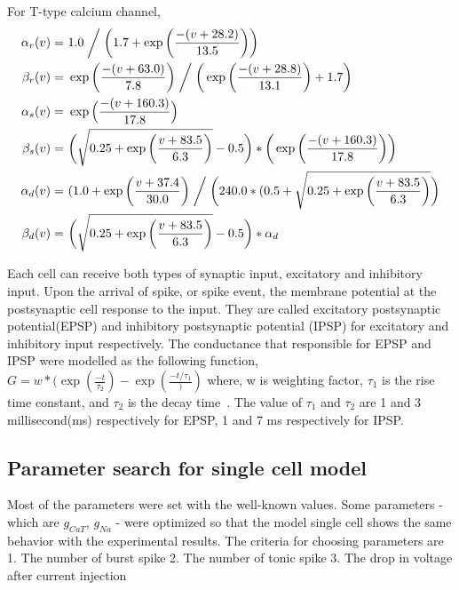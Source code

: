 For T-type calcium channel, %
\begin{align*} %
\alpha_{r}(v) =&\ 1.0\biggm/ \bigg(1.7+\exp\bigg(\frac{-(v+28.2)}{13.5}\bigg)\bigg)  \\
\beta_{r}(v) =&\ \exp\bigg(\frac{-(v+63.0)}{7.8}\bigg) \biggm/  \bigg( \exp \bigg( \frac{-(v+28.8)}{13.1} \bigg) +1.7\bigg)\\
\alpha_{s}(v) =&\ \exp \Big(\frac{-(v+160.3)}{17.8}\Big)\\
\beta_{s}(v) =&\ \bigg(\sqrt{0.25+\exp\bigg(\frac{v+83.5}{6.3}\bigg)}-0.5\bigg) *  \bigg(\exp\bigg(\frac{-(v+160.3)}{17.8}\bigg)\bigg)\\
\alpha_{d}(v) =&\ (1.0+\exp\bigg(\frac{v+37.4}{30.0}\bigg) \biggm/ \bigg(240.0*(0.5+ \sqrt{0.25+\exp\bigg(\frac{v+83.5}{6.3} \bigg) } \bigg) \\
\beta_{d}(v) =&\ \bigg(\sqrt{0.25+\exp\bigg(\frac{v+83.5}{6.3} \bigg) } -0.5\bigg)*\alpha_d\\  
\end{align*}

%
%
%
%

Each cell can receive both types of synaptic input, excitatory  and inhibitory input. Upon the arrival of spike, or spike event, the membrane potential at the postsynaptic cell response to the input. They are called excitatory postsynaptic potential(EPSP) and inhibitory postsynaptic potential (IPSP) for excitatory and inhibitory input respectively. 
The conductance that responsible for EPSP and IPSP were modelled as the following function,
$G = w*(\exp(\frac{-t}{\tau_2} ) - \exp(\frac{-t/\tau_1}))$
where, w is weighting factor, $\tau_1$ is the rise time constant, and $\tau_2$ is the decay time~\cite {constantcarnevale2006neuron}.
The value of $\tau_1$ and $\tau_2$  are 1 and 3 millisecond(ms) respectively for EPSP, 1 and 7 ms respectively for IPSP.




\subsection{Parameter search for single cell model}
Most of the parameters were set with the well-known values. Some parameters - which are 
$g_{CaT}$, $g_{Na}$ - were optimized so that the model single cell shows the same behavior with the experimental results. 
The criteria for choosing parameters are 
1. The number of burst spike
2. The number of tonic spike
3. The drop in voltage after current injection




